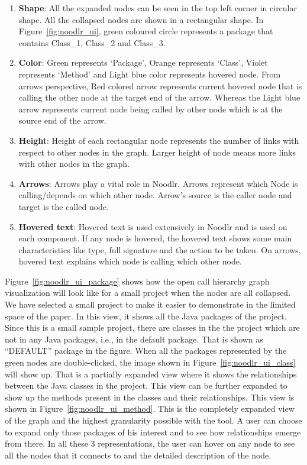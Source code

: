 \begin{enumerate}
    \item \textbf{Shape}: All the expanded nodes can be seen in the top left corner in circular shape. All the collapsed nodes are shown in a rectangular shape. In Figure~\ref{fig:noodlr_ui}, green coloured circle represents a package that contains Class\_1, Class\_2 and Class\_3.
    \item \textbf{Color}: Green represents `Package', Orange represents `Class', Violet represents `Method' and Light blue color represents hovered node.
    From arrows perspective, Red colored arrow represents current hovered node that is calling the other node at the target end of the arrow. Whereas the Light blue arrow represents current node being called by other node which is at the source end of the arrow.
    \item \textbf{Height}: Height of each rectangular node represents the number of links with respect to other nodes in the graph. Larger height of node means more links with other nodes in the graph.
    \item \textbf{Arrows}: Arrows play a vital role in Noodlr. Arrows represent which Node is calling/depends on which other node. Arrow's source is the caller node and target is the called node.
    \item \textbf{Hovered text}: Hovered text is used extensively in Noodlr and is used on each component. If any node is hovered, the hovered text shows some main characteristics like type, full signature and the action to be taken. On arrows, hovered text explains which node is calling which other node.
\end{enumerate}


Figure~\ref{fig:noodlr_ui_package} shows how the open call hierarchy graph visualization will look like for a small project when the nodes are all collapsed. We have selected a small project to make it easier to demonstrate in the limited space of the paper. In this view, it shows all the Java packages of the project. Since this is a small sample project, there are classes in the the project which are not in any Java packages, i.e., in the default package. That is shown as ``DEFAULT'' package in the figure. When all the packages represented by the green nodes are double-clicked, the image shown in Figure~\ref{fig:noodlr_ui_class} will show up. That is a partially expanded view where it shows the relationships between the Java classes in the project. This view can be further expanded to show up the methods present in the classes and their relationships. This view is shown in Figure~\ref{fig:noodlr_ui_method}. This is the completely expanded view of the graph and the highest granularity possible with the tool. A user can choose to expand only those packages of his interest and to see how relationships emerge from there. In all these 3 representations, the user can hover on any node to see all the nodes that it connects to and the detailed description of the node.


